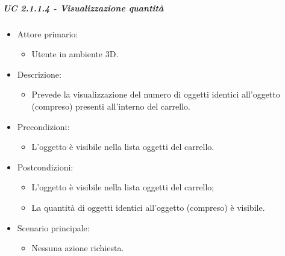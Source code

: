 \subparagraph{UC 2.1.1.4 - Visualizzazione quantità}
\begin{itemize}
	
	\item Attore primario: 
	\begin{itemize}
		\item Utente in ambiente 3D.
	\end{itemize}
	\item Descrizione:
	\begin{itemize}
		\item Prevede la visualizzazione del numero di oggetti identici all'oggetto (compreso) presenti all'interno del carrello.
	\end{itemize}
	
	\item Precondizioni:
	\begin{itemize}
		\item L'oggetto è visibile nella lista oggetti del carrello.
	\end{itemize}
	
	\item Postcondizioni:
	\begin{itemize}
		\item L'oggetto è visibile nella lista oggetti del carrello;
		\item La quantità di oggetti identici all'oggetto (compreso) è visibile.
	\end{itemize}
	
	\item Scenario principale:
	\begin{itemize}
		\item Nessuna azione richiesta.
	\end{itemize}
	
\end{itemize}

